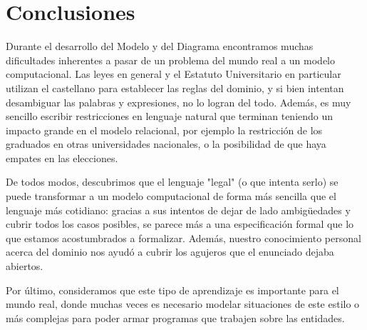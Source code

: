 \section{Conclusiones}
Durante el desarrollo del Modelo y del Diagrama encontramos muchas dificultades inherentes a pasar de un problema del mundo real a un modelo computacional. Las leyes en general y el Estatuto Universitario en particular utilizan el castellano para establecer las reglas del dominio, y si bien intentan desambiguar las palabras y expresiones, no lo logran del todo. Además, es muy sencillo escribir restricciones en lenguaje natural que terminan teniendo un impacto grande en el modelo relacional, por ejemplo la restricción de los graduados en otras universidades nacionales, o la posibilidad de que haya empates en las elecciones.

De todos modos, descubrimos que el lenguaje "legal" (o que intenta serlo) se puede transformar a un modelo computacional de forma más sencilla que el lenguaje más cotidiano: gracias a sus intentos de dejar de lado ambigüedades y cubrir todos los casos posibles, se parece más a una especificación formal que lo que estamos acostumbrados a formalizar. Además, nuestro conocimiento personal acerca del dominio nos ayudó a cubrir los agujeros que el enunciado dejaba abiertos.

Por último, consideramos que este tipo de aprendizaje es importante para el mundo real, donde muchas veces es necesario modelar situaciones de este estilo o más complejas para poder armar programas que trabajen sobre las entidades.
